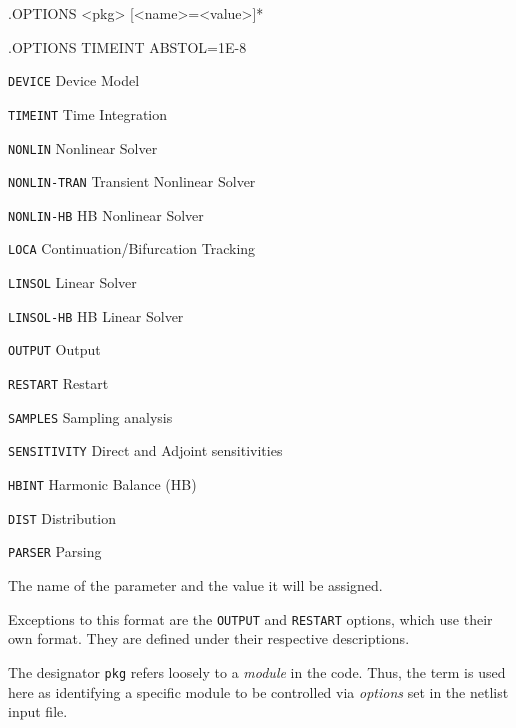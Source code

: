 \begin{Command}
\format
.OPTIONS <pkg> [<name>=<value>]*

\examples
.OPTIONS TIMEINT ABSTOL=1E-8

\arguments

\begin{Arguments}


\begin{basedescript}{
    \desclabelstyle{\multilinelabel}
    \desclabelwidth{1in}
    \renewcommand{\makelabel}[1]{\tt #1\hfill}}
  \item[\tt DEVICE]       Device Model
  \item[\tt TIMEINT]      Time Integration
  \item[\tt NONLIN]       Nonlinear Solver
  \item[\tt NONLIN-TRAN]  Transient Nonlinear Solver
  \item[\tt NONLIN-HB]    HB Nonlinear Solver
  \item[\tt LOCA]         Continuation/Bifurcation Tracking
  \item[\tt LINSOL]       Linear Solver
  \item[\tt LINSOL-HB]    HB Linear Solver
  \item[\tt OUTPUT]       Output
  \item[\tt RESTART]      Restart
  \item[\tt SAMPLES]      Sampling analysis
  \item[\tt SENSITIVITY]  Direct and Adjoint sensitivities
  \item[\tt HBINT]        Harmonic Balance (HB)
  \item[\tt DIST]         Distribution
  \item[\tt PARSER]       Parsing
\end{basedescript}

The name of the parameter and the value it will be assigned.

\end{Arguments}

\comments

Exceptions to this format are the \texttt{OUTPUT} and \texttt{RESTART}
options, which use their own format. They are defined under their
respective descriptions.

The designator \texttt{pkg} refers loosely to a {\em module} in the
code.  Thus, the term is used here as identifying a specific module to
be controlled via {\em options} set in the netlist input file.

\end{Command}

